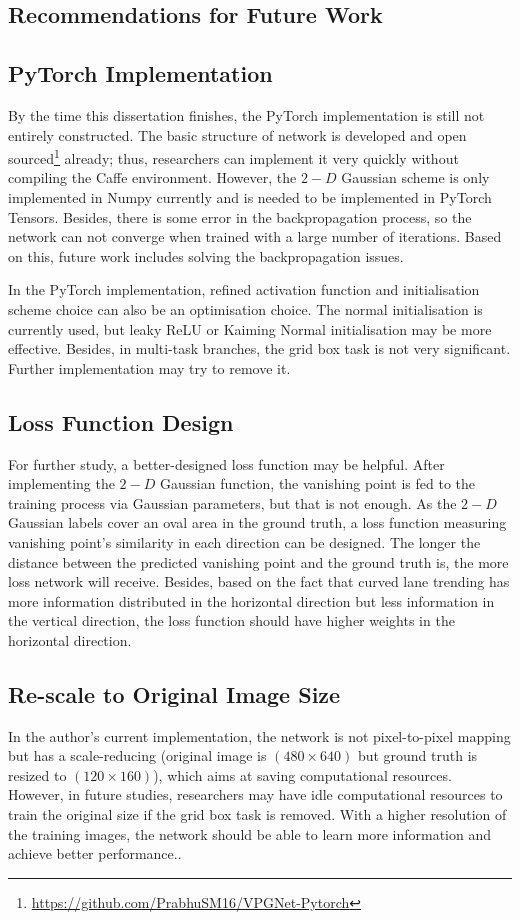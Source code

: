 \begin{spacing}{1.5}
\section{Recommendations for Future Work}

\subsection{PyTorch Implementation}

By the time this dissertation finishes, the PyTorch implementation is still not entirely constructed. The basic structure of network is developed and open sourced\footnote{\url{https://github.com/PrabhuSM16/VPGNet-Pytorch}} already; thus, researchers can implement it very quickly without compiling the Caffe environment. However, the $2-D$ Gaussian scheme is only implemented in Numpy currently and is needed to be implemented in PyTorch Tensors. Besides, there is some error in the backpropagation process, so the network can not converge when trained with a large number of iterations. Based on this, future work includes solving the backpropagation issues.

In the PyTorch implementation, refined activation function and initialisation scheme choice can also be an optimisation choice. The normal initialisation is currently used, but leaky ReLU or Kaiming Normal initialisation may be more effective. Besides, in multi-task branches, the grid box task is not very significant. Further implementation may try to remove it.

\subsection{Loss Function Design}
For further study, a better-designed loss function may be helpful. After implementing the $2-D$ Gaussian function, the vanishing point is fed to the training process via Gaussian parameters, but that is not enough. As the $2-D$ Gaussian labels cover an oval area in the ground truth, a loss function measuring vanishing point's similarity in each direction can be designed. The longer the distance between the predicted vanishing point and the ground truth is, the more loss network will receive. Besides, based on the fact that curved lane trending has more information distributed in the horizontal direction but less information in the vertical direction, the loss function should have higher weights in the horizontal direction.

\subsection{Re-scale to Original Image Size}
In the author's current implementation, the network is not pixel-to-pixel mapping but has a scale-reducing (original image is $(480 \times 640)$ but ground truth is resized to $(120 \times 160)$), which aims at saving computational resources. However, in future studies, researchers may have idle computational resources to train the original size if the grid box task is removed. With a higher resolution of the training images, the network should be able to learn more information and achieve better performance..

\end{spacing}
\newpage
